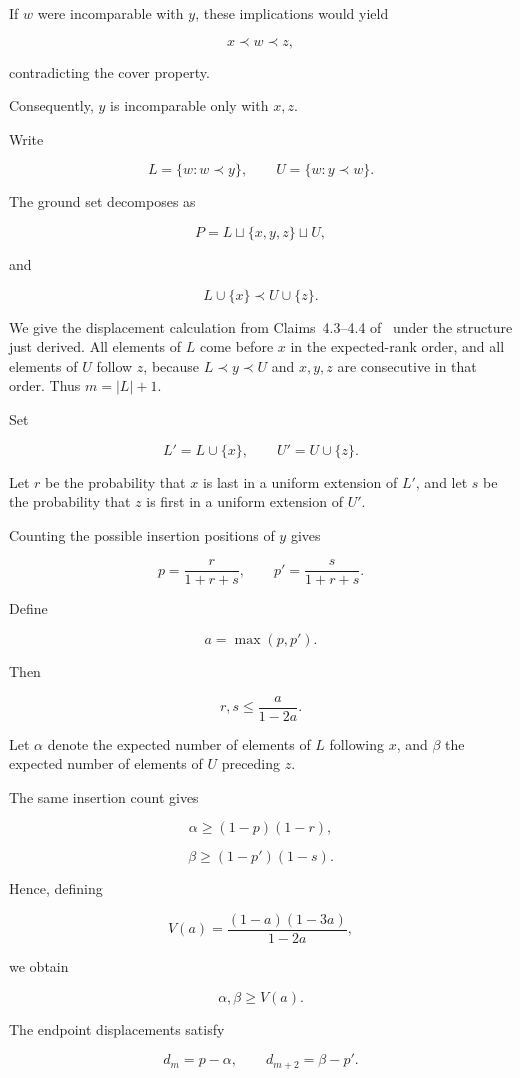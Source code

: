 \documentclass[11pt]{article}
\begin{document}
If \(w\) were incomparable with \(y\), these implications would yield

\[
x\prec w\prec z,
\]

contradicting the cover property.

Consequently, \(y\) is incomparable only with \(x,z\).

Write

\[
L=\{w:w\prec y\},
\qquad
U=\{w:y\prec w\}.
\]

The ground set decomposes as

\[
P=L\sqcup\{x,y,z\}\sqcup U,
\]

and

\[
L\cup\{x\}\prec U\cup\{z\}.
\]

We give the displacement calculation from Claims~4.3--4.4 of~\cite{ACPP} under the structure just derived. All elements of $L$ come before $x$ in the expected-rank order, and all elements of $U$ follow $z$, because $L\prec y\prec U$ and $x,y,z$ are consecutive in that order. Thus $m=|L|+1$.

Set

\[
L'=L\cup\{x\},\qquad U'=U\cup\{z\}.
\]

Let \(r\) be the probability that \(x\) is last in a uniform extension of \(L'\), and let \(s\) be the probability that \(z\) is first in a uniform extension of \(U'\).

Counting the possible insertion positions of \(y\) gives

\[
p=\frac r{1+r+s},
\qquad
p'=\frac s{1+r+s}.
\]

Define

\[
a=\max(p,p').
\]

Then

\[
r,s\leq\frac a{1-2a}.
\]

Let \(\alpha\) denote the expected number of elements of \(L\) following \(x\), and \(\beta\) the expected number of elements of \(U\) preceding \(z\).

The same insertion count gives

\[
\alpha\geq(1-p)(1-r),
\]

\[
\beta\geq(1-p')(1-s).
\]

Hence, defining

\[
V(a)=\frac{(1-a)(1-3a)}{1-2a},
\]

we obtain

\[
\alpha,\beta\geq V(a).
\]

The endpoint displacements satisfy

\[
d_m=p-\alpha,
\qquad
d_{m+2}=\beta-p'.
\]
\end{document}
